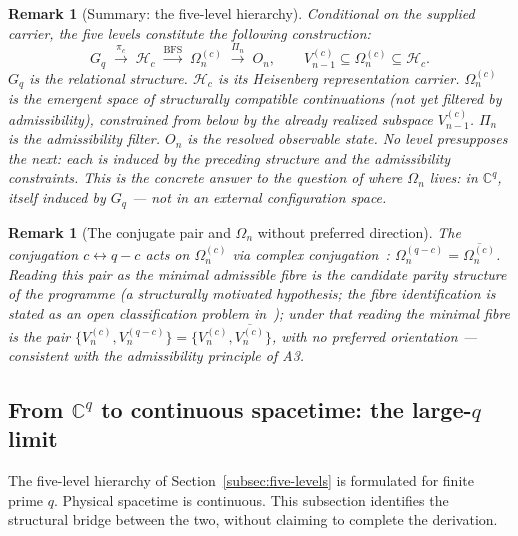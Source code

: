 \documentclass[11pt,a4paper]{article}
\newtheorem{remark}[theorem]{Remark}
\begin{document}
      \begin{remark}[Summary: the five-level hierarchy]
  Conditional on the supplied carrier, the five levels constitute the
  following construction:
  \begin{equation}
    G_q
    \;\xrightarrow{\pi_c}\;
    \mathcal{H}_c
    \;\xrightarrow{\mathrm{BFS}}\;
    \Omega_n^{(c)}
    \;\xrightarrow{\Pi_n}\;
    O_n,
    \qquad
    V_{n-1}^{(c)} \subseteq \Omega_n^{(c)} \subseteq \mathcal{H}_c.
  \end{equation}
  $G_q$ is the relational structure.
  $\mathcal{H}_c$ is its Heisenberg representation carrier.
  $\Omega_n^{(c)}$ is the emergent space of structurally compatible continuations
  (not yet filtered by admissibility),
  constrained from below by the already realized subspace $V_{n-1}^{(c)}$.
  $\Pi_n$ is the admissibility filter.
  $O_n$ is the resolved observable state.
  No level presupposes the next: each is induced by the preceding structure
  and the admissibility constraints.
  This is the concrete answer to the question of where $\Omega_n$ lives:
  in $\mathbb{C}^q$, itself induced by $G_q$ — not in an external configuration
  space.
      \end{remark}

      \begin{remark}[The conjugate pair and $\Omega_n$ without preferred direction]
  The conjugation $c \leftrightarrow q-c$ acts on $\Omega_n^{(c)}$
  via complex conjugation~\cite{Beau2026a21}:
  $\Omega_n^{(q-c)} = \overline{\Omega_n^{(c)}}$.
  Reading this pair as the minimal admissible fibre is the candidate parity
  structure of the programme (a structurally motivated hypothesis; the fibre
  identification is stated as an open classification problem
  in~\cite{Beau2026a22}); under that reading the minimal fibre is the pair
  $\{V_n^{(c)}, V_n^{(q-c)}\} = \{V_n^{(c)}, \overline{V_n^{(c)}}\}$,
  with no preferred orientation — consistent with the admissibility principle
  of A3.
      \end{remark}

  \subsection{From $\mathbb{C}^q$ to continuous spacetime: the large-$q$ limit}
  \label{subsec:continuum-limit}

  The five-level hierarchy of Section~\ref{subsec:five-levels} is formulated
  for finite prime $q$.
  Physical spacetime is continuous.
  This subsection identifies the structural bridge between the two, without
  claiming to complete the derivation.
\end{document}
